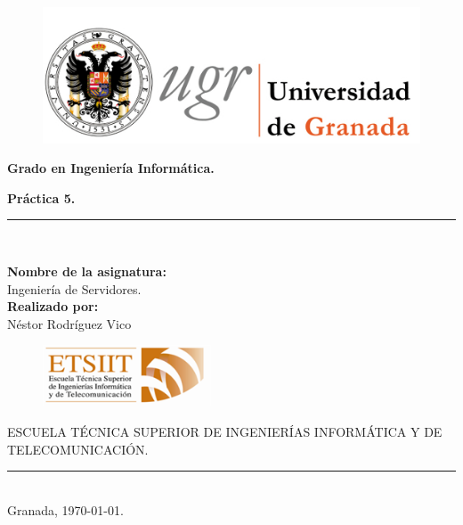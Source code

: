 \documentclass[a4paper,titlepage,12pt]{scrartcl}	%
\numberwithin{figure}{section} %
\numberwithin{table}{section} %
\begin{document}
	\lstset{inputencoding=utf8/latin1} %
	\begin{titlepage}
		\begin{center}
			\begin{figure}[htb]
				\begin{center}
					\includegraphics[width=12cm]{./Portada/ugr.png}
				\end{center}
			\end{figure}

			\vspace*{0.8cm}
			\begin{Large}
				\textbf{Grado en Ingeniería Informática.}\\
			\end{Large}
			\begin{Huge}
				\vspace{1.5cm}
				\textbf{Práctica 5.} \\
			\end{Huge}
			\vspace*{0.76cm}
			\rule{100mm}{0.1mm}\\
			\vspace*{0.5cm}
			\begin{large}
				\textbf{Nombre de la asignatura:}\\
				Ingeniería de Servidores.\\
				\vspace*{0.5cm}
				\textbf{Realizado por:}\\
				Néstor Rodríguez Vico \\

				\vspace*{2cm}
				\begin{figure}[htb]
					\begin{center}
						\includegraphics[width=5cm]{./Portada/etsiit.png}
					\end{center}
				\end{figure}
				\vspace*{-0.6cm}
				ESCUELA TÉCNICA SUPERIOR DE INGENIERÍAS INFORMÁTICA Y DE TELECOMUNICACIÓN.\\
				\rule{20mm}{0.1mm}\\
				\vspace*{0.6cm}
				Granada, \today.
			\end{large}
		\end{center}
	\end{titlepage}
	
\end{document}
